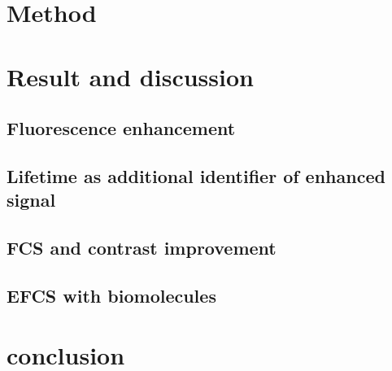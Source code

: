 \section{Method}
\section{Result and discussion}
\subsection{Fluorescence enhancement}
\subsection{Lifetime as additional identifier of enhanced signal}
\subsection{FCS and contrast improvement}
\subsection{EFCS with biomolecules}
\section{conclusion}

